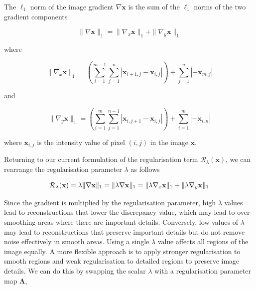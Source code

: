 \documentclass[12pt]{article}
\begin{document}
The $\ell_1$ norm of the image gradient $\nabla \mathbf{x}$ is the sum of the $\ell_1$ norms of the two gradient components

\begin{equation}
  \| \nabla \mathbf{x} \|_1 = \| \nabla_x \mathbf{x} \|_1 + \| \nabla_y \mathbf{x} \|_1
\end{equation}

where

\begin{equation}
  \| \nabla_x \mathbf{x} \|_1 = \left( \sum_{i=1}^{m-1} \sum_{j=1}^{n} |\mathbf{x}_{i+1,j} - \mathbf{x}_{i,j}| \right) + \sum_{j=1}^{n} |- \mathbf{x}_{m,j}|
\end{equation}

and

\begin{equation}
  \| \nabla_y \mathbf{x} \|_1 = \left( \sum_{i=1}^{m} \sum_{j=1}^{n-1} |\mathbf{x}_{i,j+1} - \mathbf{x}_{i,j}| \right) + \sum_{i=1}^{m} |- \mathbf{x}_{i,n}|
\end{equation}


where $\mathbf{x}_{i,j}$ is the intensity value of pixel $(i,j)$ in the image $\mathbf{x}$. 

Returning to our current formulation of the regularisation term $\mathcal{R}_{\lambda}(\mathbf{x})$, we can rearrange the regularisation parameter $\lambda$ as follows

\begin{equation}
    \mathcal{R}_{\lambda}(\mathbf{x}) 
    = \lambda \| \nabla \mathbf{x} \|_1 \\
    = \| \lambda \nabla \mathbf{x} \|_1 \\
    = \| \lambda \nabla_x \mathbf{x} \|_1 + \| \lambda \nabla_y \mathbf{x} \|_1
\end{equation}

Since the gradient is multiplied by the regularisation parameter, high $\lambda$ values lead to reconstructions that lower the discrepancy value, which may lead to over-smoothing areas where there are important details. Conversely, low values of $\lambda$ 
may lead to reconstructions that preserve important details but do not remove noise effectively in smooth areas.
Using a single $\lambda$ value affects all regions of the image equally.
A more flexible approach is to
apply stronger regularisation to smooth regions and weak regularisation to detailed regions to preserve image details.
We can do this by swapping the scalar $\lambda$ with a regularisation parameter map $\mathbf{\Lambda}$,
\end{document}
